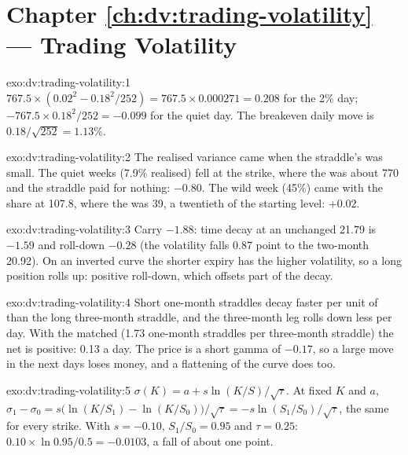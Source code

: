 \section*{Chapter \ref{ch:dv:trading-volatility} --- Trading Volatility}

\begin{solution}{exo:dv:trading-volatility:1}
$767.5\times(0.02^2-0.18^2/252)=767.5\times0.000271=0.208$ for the 2\% day; $-767.5\times0.18^2/252=-0.099$ for the quiet day. The breakeven
daily move is $0.18/\sqrt{252}=1.13\%$.
\end{solution}

\begin{solution}{exo:dv:trading-volatility:2}
The realised variance came when the straddle's  was small. The quiet weeks (7.9\% realised) fell at the strike, where the  was
about 770 and the straddle paid  for nothing: $-0.80$. The wild week (45\%) came with the share at 107.8, where the  was 39, a
twentieth of the starting level: $+0.02$.
\end{solution}

\begin{solution}{exo:dv:trading-volatility:3}
Carry $-1.88$: time decay at an unchanged 21.79 is $-1.59$ and roll-down $-0.28$ (the volatility falls 0.87 point to the two-month 20.92). On an
inverted curve the shorter expiry has the higher volatility, so a long position rolls up: positive roll-down, which offsets part of the decay.
\end{solution}

\begin{solution}{exo:dv:trading-volatility:4}
Short one-month straddles decay faster per unit of  than the long three-month straddle, and the three-month leg rolls down less per day. With
the  matched (1.73 one-month straddles per three-month straddle) the net  is positive: 0.13 a day. The price is a short gamma of $-0.17$, so
a large move in the next days loses money, and a flattening of the curve does too.
\end{solution}

\begin{solution}{exo:dv:trading-volatility:5}
$\sigma(K)=a+s\ln(K/S)/\sqrt\tau$. At fixed $K$ and $a$, $\sigma_1-\sigma_0=s\bigl(\ln(K/S_1)-\ln(K/S_0)\bigr)/\sqrt\tau=-s\ln(S_1/S_0)/\sqrt\tau$, the same for
every strike. With $s=-0.10$, $S_1/S_0=0.95$ and $\tau=0.25$: $0.10\times\ln0.95/0.5=-0.0103$, a fall of about one point.
\end{solution}

